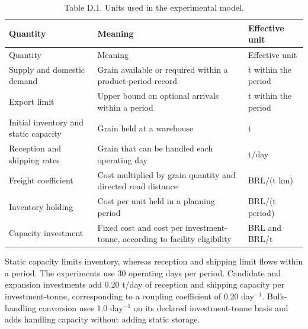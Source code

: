 \documentclass[
  english,
  11pt,
  a4paper,
]{article}
\begin{document}
\begin{longtable}[]{@{}
  >{\raggedright\arraybackslash}p{}
  >{\raggedright\arraybackslash}p{}
  >{\raggedright\arraybackslash}p{}@{}}
\caption{Table D.1. Units used in the experimental
model.}\tabularnewline
\toprule\noalign{}
\begin{minipage}[b]{\linewidth}\raggedright
Quantity
\end{minipage} & \begin{minipage}[b]{\linewidth}\raggedright
Meaning
\end{minipage} & \begin{minipage}[b]{\linewidth}\raggedright
Effective unit
\end{minipage} \\
\midrule\noalign{}
\endfirsthead
\toprule\noalign{}
\begin{minipage}[b]{\linewidth}\raggedright
Quantity
\end{minipage} & \begin{minipage}[b]{\linewidth}\raggedright
Meaning
\end{minipage} & \begin{minipage}[b]{\linewidth}\raggedright
Effective unit
\end{minipage} \\
\midrule\noalign{}
\endhead
\bottomrule\noalign{}
\endlastfoot
Supply and domestic demand & Grain available or required within a
product-period record & t within the period \\
Export limit & Upper bound on optional arrivals within a period & t
within the period \\
Initial inventory and static capacity & Grain held at a warehouse & t \\
Reception and shipping rates & Grain that can be handled each operating
day & t/day \\
Freight coefficient & Cost multiplied by grain quantity and directed
road distance & BRL/(t km) \\
Inventory holding & Cost per unit held in a planning period & BRL/(t
period) \\
Capacity investment & Fixed cost and cost per investment-tonne,
according to facility eligibility & BRL and BRL/t \\
\end{longtable}

Static capacity limits inventory, whereas reception and shipping limit
flows within a period. The experiments use 30 operating days per period.
Candidate and expansion investments add 0.20 t/day of reception and
shipping capacity per investment-tonne, corresponding to a coupling
coefficient of 0.20 day\(^{-1}\). Bulk-handling conversion uses 1.0
day\(^{-1}\) on its declared investment-tonne basis and adds handling
capacity without adding static storage.
\end{document}
